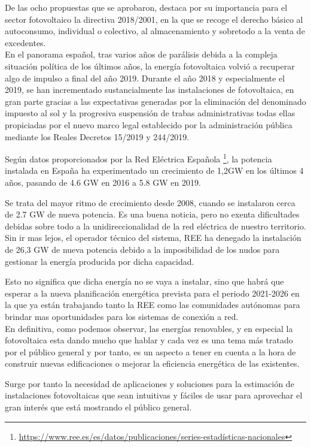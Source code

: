 De las ocho propuestas que se aprobaron, destaca por su importancia para el sector fotovoltaico la directiva 2018/2001, en la que se recoge el derecho básico al autoconsumo, individual o colectivo, al almacenamiento y sobretodo a la venta de excedentes.\\

En el panorama español, tras varios años de parálisis debida a la compleja situación política de los últimos años, la energía fotovoltaica volvió a recuperar algo de impulso a final del año 2019. Durante el año 2018 y especialmente el 2019, se han incrementado sustancialmente las instalaciones de fotovoltaica, en gran parte gracias a las expectativas generadas por la eliminación del denominado impuesto al sol y la progresiva suspensión de trabas administrativas todas ellas propiciadas por el nuevo marco legal establecido por la administración pública mediante los Reales Decretos 15/2019 y 244/2019.

Según datos proporcionados por la Red Eléctrica Española \footnote{\url{https://www.ree.es/es/datos/publicaciones/series-estadísticas-nacionales}}, la potencia instalada en España ha experimentado un crecimiento de 1,2GW en los últimos 4 años, pasando de 4.6 GW en 2016 a 5.8 GW en 2019.

Se trata del mayor ritmo de crecimiento desde 2008, cuando se instalaron cerca de 2.7 GW de nueva potencia. Es una buena noticia, pero no exenta dificultades debidas sobre todo a la unidireccionalidad de la red eléctrica de nuestro territorio. Sin ir mas lejos, el operador técnico del sistema, REE ha denegado la instalación de 26,3 GW de nueva potencia debido a la imposibilidad de los nudos para gestionar la energía producida por dicha capacidad.

Esto no significa que dicha energía no se vaya a instalar, sino que habrá que esperar a la nueva planificación energética prevista para el periodo 2021-2026 en la que ya están trabajando tanto la REE como las comunidades autónomas para brindar mas oportunidades para los sistemas de conexión a red.\\

En definitiva, como podemos observar, las energías renovables, y en especial la fotovoltaica esta dando mucho que hablar y cada vez es una tema más tratado por el público general y por tanto, es un aspecto a tener en cuenta a la hora de construir nuevas edificaciones o mejorar la eficiencia energética de las existentes.

Surge por tanto la necesidad de aplicaciones y soluciones para la estimación de instalaciones fotovoltaicas que sean intuitivas y fáciles de usar para aprovechar el gran interés que está mostrando el público general.

